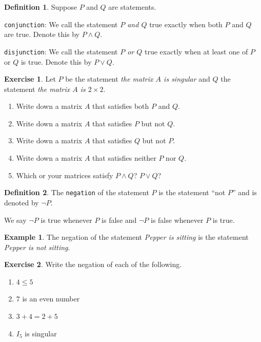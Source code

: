 \documentclass[handout]{beamer}
\newcommand{\fn}{\insertframenumber}
\theoremstyle{definition}
\newtheorem{exercise}{Exercise}
\newtheorem*{defn}{Definition}
\newtheorem*{exa}{Example}
\renewcommand{\emph}[1]{{\color{blue}\texttt{#1}}}
\begin{document}
\begin{frame}{\fn}
	\begin{defn}
		Suppose $P$ and $Q$ are statements.
		
		\emph{conjunction}: We call the statement \textit{$P$ and $Q$} true exactly when both $P$ and $Q$ are true. Denote this by $P\wedge Q$.
		
		\emph{disjunction}: We call the statement \textit{$P$ or $Q$} true exactly when at least one of $P$ or $Q$ is true. Denote this by $P\vee Q$.
	\end{defn}
	\begin{exercise}
		Let $P$ be the statement \textit{the matrix $A$ is singular} and $Q$ the statement \textit{the matrix $A$ is $2\times 2$}.
		\begin{enumerate}[label=(\alph*)]
			\item Write down a matrix $A$ that satisfies both $P$ and $Q$.
			\item Write down a matrix $A$ that satisfies $P$ but not $Q$.
			\item Write down a matrix $A$ that satisfies $Q$ but not $P$.
			\item Write down a matrix $A$ that satisfies neither $P$ nor $Q$.
			\item Which or your matrices satisfy $P\wedge Q$? $P\vee Q$?
		\end{enumerate}
	\end{exercise}
\end{frame}
\begin{frame}{\fn}
	\begin{defn}
		The \emph{negation} of the statement $P$ is the statement ``not $P$'' and is denoted by $\neg P$.
		
		We say $\neg P$ is true whenever $P$ is false and $\neg P$ is false whenever $P$ is true.
	\end{defn}
	\begin{exa}
		The negation of the statement \textit{Pepper is sitting} is the statement \textit{Pepper is not sitting}.
	\end{exa}
	\begin{exercise}
		Write the negation of each of the following.
			\begin{enumerate}[label=(\alph*)]
				\item $4\leq 5$
				\item $7$ is an even number
				\item $3+4=2+5$
				\item $I_5$ is singular
			\end{enumerate}
	\end{exercise}
\end{frame}
\end{document}
